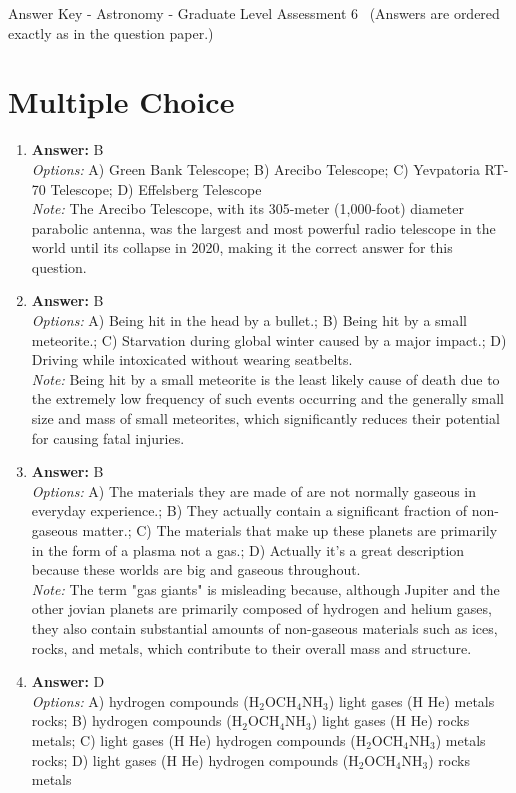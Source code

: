 \documentclass[12pt]{article}
\begin{document}
\begin{center}
Answer Key - Astronomy - Graduate Level Assessment 6 \
\small (Answers are ordered exactly as in the question paper.)
\end{center}

\section*{Multiple Choice}
\begin{enumerate}[label=\arabic*.]
\item \textbf{Answer:} B
\\ \textit{Options:} A) Green Bank Telescope; B) Arecibo Telescope; C) Yevpatoria RT-70 Telescope; D) Effelsberg Telescope
\\ \textit{Note:} The Arecibo Telescope, with its 305-meter (1,000-foot) diameter parabolic antenna, was the largest and most powerful radio telescope in the world until its collapse in 2020, making it the correct answer for this question.
\item \textbf{Answer:} B
\\ \textit{Options:} A) Being hit in the head by a bullet.; B) Being hit by a small meteorite.; C) Starvation during global winter caused by a major impact.; D) Driving while intoxicated without wearing seatbelts.
\\ \textit{Note:} Being hit by a small meteorite is the least likely cause of death due to the extremely low frequency of such events occurring and the generally small size and mass of small meteorites, which significantly reduces their potential for causing fatal injuries.
\item \textbf{Answer:} B
\\ \textit{Options:} A) The materials they are made of are not normally gaseous in everyday experience.; B) They actually contain a significant fraction of non-gaseous matter.; C) The materials that make up these planets are primarily in the form of a plasma not a gas.; D) Actually it's a great description because these worlds are big and gaseous throughout.
\\ \textit{Note:} The term "gas giants" is misleading because, although Jupiter and the other jovian planets are primarily composed of hydrogen and helium gases, they also contain substantial amounts of non-gaseous materials such as ices, rocks, and metals, which contribute to their overall mass and structure.
\item \textbf{Answer:} D
\\ \textit{Options:} A) hydrogen compounds (H$_{2}$OCH$_{4}$NH$_{3}$) light gases (H He) metals rocks; B) hydrogen compounds (H$_{2}$OCH$_{4}$NH$_{3}$) light gases (H He) rocks metals; C) light gases (H He) hydrogen compounds (H$_{2}$OCH$_{4}$NH$_{3}$) metals rocks; D) light gases (H He) hydrogen compounds (H$_{2}$OCH$_{4}$NH$_{3}$) rocks metals

\end{enumerate}
\end{document}
